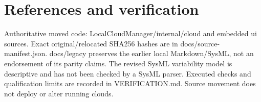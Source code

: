 \documentclass[a4paper]{arrowhead}
\begin{document}
\section{References and verification}
Authoritative moved code: LocalCloudManager/internal/cloud and embedded ui sources. Exact original/relocated SHA256 hashes are in docs/source-manifest.json. docs/legacy preserves the earlier local Markdown/SysML, not an endorsement of its parity claims. The revised SysML variability model is descriptive and has not been checked by a SysML parser. Executed checks and qualification limits are recorded in VERIFICATION.md. Source movement does not deploy or alter running clouds.
\end{document}
